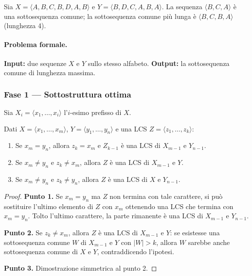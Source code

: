 \begin{esempio}
Sia $X = \langle A, B, C, B, D, A, B \rangle$ e $Y = \langle B, D, C, A, B, A \rangle$.
La sequenza $\langle B, C, A \rangle$ è una sottosequenza comune; la sottosequenza
comune più lunga è $\langle B, C, B, A \rangle$ (lunghezza 4).
\end{esempio}

\paragraph{Problema formale.}
\textbf{Input:} due sequenze $X$ e $Y$ sullo stesso alfabeto.
\textbf{Output:} la sottosequenza comune di lunghezza massima.

\subsubsection{Fase 1 — Sottostruttura ottima}

Sia $X_i = \langle x_1, \ldots, x_i \rangle$ l'$i$-esimo prefisso di $X$.

\begin{teorema}
Dati $X = \langle x_1, \ldots, x_m \rangle$, $Y = \langle y_1, \ldots, y_n \rangle$
e una LCS $Z = \langle z_1, \ldots, z_k \rangle$:
\begin{enumerate}
	\item Se $x_m = y_n$, allora $z_k = x_m$ e $Z_{k-1}$ è una LCS di $X_{m-1}$ e
	$Y_{n-1}$.
	\item Se $x_m \neq y_n$ e $z_k \neq x_m$, allora $Z$ è una LCS di $X_{m-1}$ e $Y$.
	\item Se $x_m \neq y_n$ e $z_k \neq y_n$, allora $Z$ è una LCS di $X$ e $Y_{n-1}$.
\end{enumerate}
\end{teorema}

\begin{proof}
\textbf{Punto 1.} Se $x_m = y_n$ ma $Z$ non termina con tale carattere, si può
sostituire l'ultimo elemento di $Z$ con $x_m$ ottenendo una LCS che termina con
$x_m = y_n$. Tolto l'ultimo carattere, la parte rimanente è una LCS di $X_{m-1}$ e
$Y_{n-1}$.

\textbf{Punto 2.} Se $z_k \neq x_m$, allora $Z$ è una LCS di $X_{m-1}$ e $Y$: se
esistesse una sottosequenza comune $W$ di $X_{m-1}$ e $Y$ con $|W| > k$, allora $W$
sarebbe anche sottosequenza comune di $X$ e $Y$, contraddicendo l'ipotesi.

\textbf{Punto 3.} Dimostrazione simmetrica al punto 2.
\end{proof}

